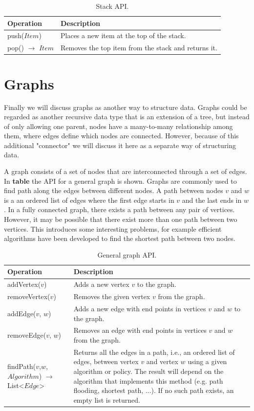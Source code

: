 \begin{table}[H]
	\caption{Stack API.}
	\label{tab:api:stack}
	\begin{tabular}{p{150px} | p{250px}}
		\textbf{Operation} & \textbf{Description} \\
		\hline
		push($Item$) & Places a new item at the top of the stack. \\
		pop() $\rightarrow$ $Item$ & Removes the top item from the stack and returns it. \\
		\hline
	\end{tabular}
\end{table}



\section{Graphs}

Finally we will discuss graphs as another way to structure data. Graphs could be regarded as another recursive data type that is an extension of a tree, but instead of only allowing one parent, nodes have a many-to-many relationship among them, where edges define which nodes are connected. However, because of this additional "connector" we will discuss it here as a separate way of structuring data.

A graph consists of a set of nodes that are interconnected through a set of edges. In \textbf{table} the API for a general graph is shown. Graphs are commonly used to find path along the edges between different nodes. A path between nodes $v$ and $w$ is a an ordered list of edges where the first edge starts in $v$ and the last ends in $w$. In a fully connected graph, there exists a path between any pair of vertices. However, it may be possible that there exist more than one path between two vertices. This introduces some interesting problems, for example efficient algorithms have been developed to find the shortest path between two nodes.

\begin{table}[H]
	\caption{General graph API.}
	\label{tab:api:graph}
	\begin{tabular}{p{150px} | p{250px}}
		\textbf{Operation} & \textbf{Description} \\
		\hline
		addVertex($v$) & Adds a new vertex $v$ to the graph. \\
		removeVertex($v$) & Removes the given vertex $v$ from the graph. \\
		addEdge($v$, $w$) & Adds a new edge with end points in vertices $v$ and $w$ to the graph. \\
		removeEdge($v$, $w$) & Removes an edge with end points in vertices $v$ and $w$ from the graph. \\
		findPath($v$,$w$,$Algorithm$)  $\rightarrow$ List<$Edge$> & Returns all the edges in a path, i.e., an ordered list of edges, between vertex $v$ and vertex $w$ using a given algorithm or policy. The result will depend on the algorithm that implements this method (e.g. path flooding, shortest path, ...). If no such path exists, an empty list is returned. \\
		\hline
	\end{tabular}
\end{table}

